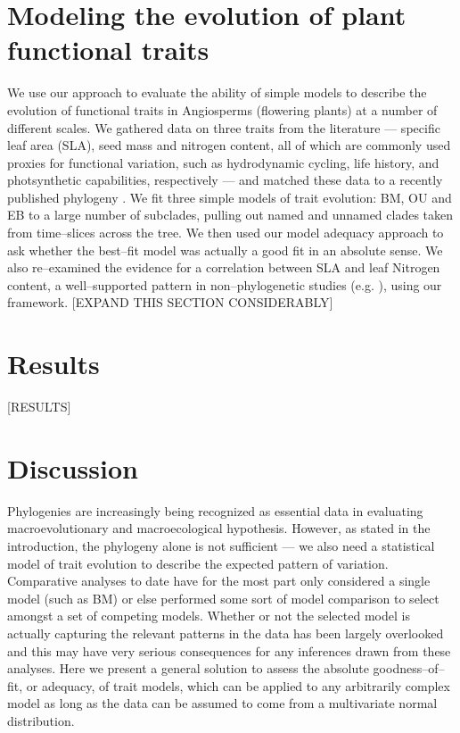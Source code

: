 \documentclass[a4paper,12pt]{article}
\begin{document}
\section{Modeling the evolution of plant functional traits}

We use our approach to evaluate the ability of simple models to describe the evolution of functional traits in Angiosperms (flowering plants) at a number of different scales. We gathered data on three traits from the literature --- specific leaf area (SLA), seed mass and nitrogen content, all of which are commonly used proxies for functional variation, such as hydrodynamic cycling, life history, and photsynthetic capabilities, respectively \citep{Westoby2002} --- and matched these data to a recently published phylogeny \citep{Zanne2013}. We fit three simple models of trait evolution: BM, OU and EB \citep{Harmon2010} to a large number of subclades, pulling out named and unnamed clades taken from time--slices across the tree. We then used our model adequacy approach to ask whether the best--fit model was actually a good fit in an absolute sense. We also re--examined the evidence for a correlation between SLA and leaf Nitrogen content, a well--supported pattern in non--phylogenetic studies (e.g. \citep{Wright2004}), using our framework. [EXPAND THIS SECTION CONSIDERABLY]


\section{Results}

[RESULTS]

\section{Discussion}

Phylogenies are increasingly being recognized as essential data in evaluating macroevolutionary and macroecological hypothesis. However, as stated in the introduction, the phylogeny alone is not sufficient --- we also need a statistical model of trait evolution to describe the expected pattern of variation. Comparative analyses to date have for the most part only considered a single model (such as BM) or else performed some sort of model comparison to select amongst a set of competing models. Whether or not the selected model is actually capturing the relevant patterns in the data has been largely overlooked and this may have very serious consequences for any inferences drawn from these analyses. Here we present a general solution to assess the absolute goodness--of--fit, or adequacy, of trait models, which can be applied to any arbitrarily complex model as long as the data can be assumed to come from a multivariate normal distribution.
\end{document}

